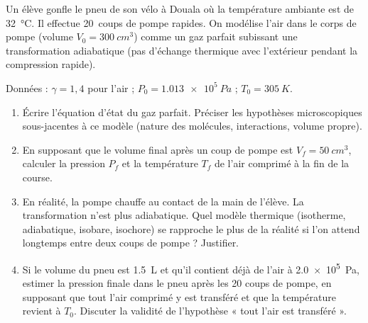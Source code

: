 \documentclass[11pt]{article}
\begin{document}
\begin{exercice}
Un élève gonfle le pneu de son vélo à Douala où la température ambiante est de \SI{32}{\celsius}. Il effectue \SI{20}{coups} de pompe rapides. On modélise l'air dans le corps de pompe (volume $V_0 = \SI{300}{cm^3}$) comme un gaz parfait subissant une transformation adiabatique (pas d'échange thermique avec l'extérieur pendant la compression rapide).

Données : $\gamma = 1,4$ pour l'air ; $P_0 = \SI{1,013e5}{Pa}$ ; $T_0 = \SI{305}{K}$.

\begin{enumerate}
    \item Écrire l'équation d'état du gaz parfait. Préciser les hypothèses microscopiques sous-jacentes à ce modèle (nature des molécules, interactions, volume propre).
    \item En supposant que le volume final après un coup de pompe est $V_f = \SI{50}{cm^3}$, calculer la pression $P_f$ et la température $T_f$ de l'air comprimé à la fin de la course.
    \item En réalité, la pompe chauffe au contact de la main de l'élève. La transformation n'est plus adiabatique. Quel modèle thermique (isotherme, adiabatique, isobare, isochore) se rapproche le plus de la réalité si l'on attend longtemps entre deux coups de pompe ? Justifier.
    \item Si le volume du pneu est \SI{1,5}{L} et qu'il contient déjà de l'air à \SI{2,0e5}{Pa}, estimer la pression finale dans le pneu après les 20 coups de pompe, en supposant que tout l'air comprimé y est transféré et que la température revient à $T_0$. Discuter la validité de l'hypothèse « tout l'air est transféré ».
\end{enumerate}
\end{exercice}
\end{document}
